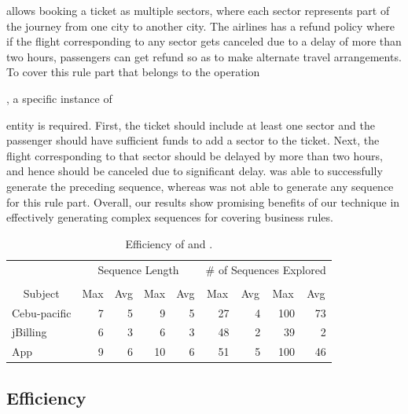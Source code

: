 \subject{Cebu-pacific} allows booking a ticket as multiple sectors, 
where each sector represents part of the journey from one city to another city. The airlines
has a refund policy where if the flight corresponding to any sector gets canceled
due to a delay of more than two hours, passengers can get refund so as to make alternate
travel arrangements. To cover this rule part that belongs to the operation
\subject{Refund}, a specific instance of \subject{Ticket} entity
is required. First, the ticket should include at least one sector and the passenger
should have sufficient funds to add a sector to the ticket. Next, the flight corresponding
to that sector should be delayed by more than two hours, and hence should be canceled
due to significant delay. \tool{} was able to successfully generate the preceding sequence,
whereas \exhaust{} was not able to generate any sequence for this rule part.
Overall, our results show promising benefits of our technique in effectively generating
complex sequences for covering business rules.

\begin{table}[t]
\caption{Efficiency of \tool{} and \exhaust{}.}
\centering
{\scriptsize
\tabcolsep=3pt
\begin{tabular}{|l|r|r|r|r|r|r|r|r|}
\hline
& \multicolumn{4}{|c|}{Sequence Length} & \multicolumn{4}{|c|}{\# of Sequences Explored} \\
\cline{2-9}
& \multicolumn{2}{|c|}{\tool{}} & \multicolumn{2}{|c|}{\exhaust{}} & \multicolumn{2}{|c|}{\tool{}} & \multicolumn{2}{|c|}{\exhaust{}}  \\
\cline{2-9}
\multicolumn{1}{|c|}{Subject} & \multicolumn{1}{|c|}{Max} & \multicolumn{1}{|c|}{Avg} & \multicolumn{1}{|c|}{Max} & \multicolumn{1}{|c|}{Avg} & \multicolumn{1}{|c|}{Max} & \multicolumn{1}{|c|}{Avg} & \multicolumn{1}{|c|}{Max} & \multicolumn{1}{|c|}{Avg} \\
\hline \hline
Cebu-pacific 	 &  7		& 5 &  9 &  5	 &  27 &  4	&  100 & 73 \\
jBilling		 	 &  6		& 3 &  6 &  3	 &  48 &  2	&  39  &  2 \\
App					 	 &  9		& 6 & 10 &  6	 &  51 &  5	& 100  & 46 \\
\hline
\end{tabular}
}
\label{tab:stats}
\end{table}

\subsection{Efficiency}

